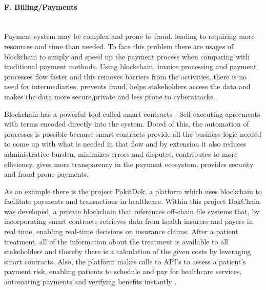\paragraph{F. Billing/Payments} \mbox{}\\
Payment system may be complex and prone to fraud, leading to requiring more resources and time than needed. To face this problem 
there are usages of blockchain to simply and speed up the payment process when comparing with traditional payment methods. Using blockchain, 
invoice processing and payment processes flow faster and this removes barriers from the activities, there is no need for intermediaries, 
prevents fraud, helps stakeholders access the data and makes the data more secure,private and less prone to cyberattacks. 

Blockchain has a powerful tool called smart contracts - Self-executing agreements with terms encoded directly into the system. Doted of 
this, the automation of processes is possible because smart contracts provide all the business logic needed to come up with what is needed 
in that flow and by extension it also reduces administrative burden, minimizes errors and disputes, contributes to more efficiency, gives 
more transparency in the payment ecosystem, provides security and fraud-prone payments.

As an example there is the project PokitDok, a platform which uses blockchain to facilitate payments and transactions in healthcare. 
Within this project DokChain was developed, a private blockchain that references off-chain file systems that, by incorporating smart 
contracts retrieves data from health insurers and payers in real time, enabling real-time decisions on insurance claims. After a patient 
treatment, all of the information about the treatment is available to all stakeholders and thereby there is a calculation of the given costs 
by leveraging smart contracts. Also, the platform makes calls to API's to assess a patient's payment risk, enabling patients to schedule 
and pay for healthcare services, automating payments and verifying benefits instantly \cite{poki-dok}.

